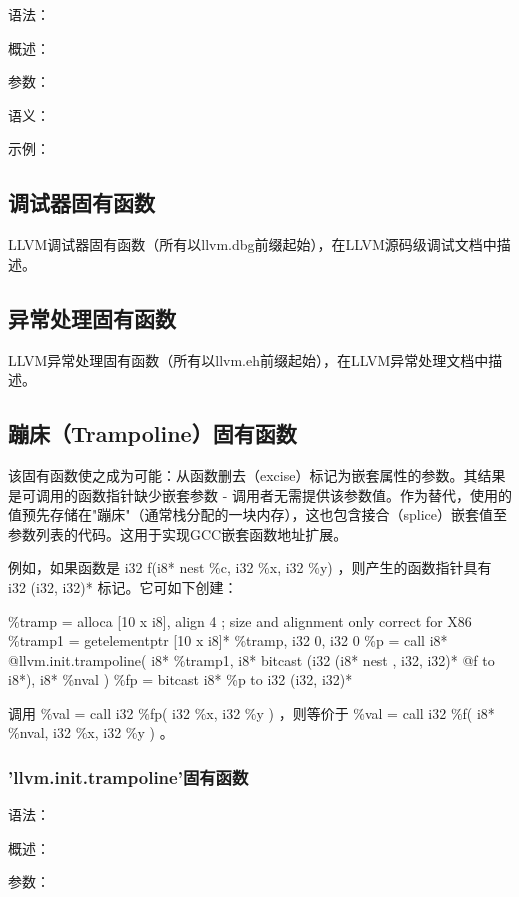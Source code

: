 \documentclass[12pt,a4paper]{article}
\begin{document}
{语法：

概述：

参数：

语义：

示例：


\subsection{调试器固有函数}

LLVM调试器固有函数（所有以llvm.dbg前缀起始），在LLVM源码级调试文档中描述。

\subsection{异常处理固有函数}

LLVM异常处理固有函数（所有以llvm.eh前缀起始），在LLVM异常处理文档中描述。

\subsection{蹦床（Trampoline）固有函数}

该固有函数使之成为可能：从函数删去（excise）标记为嵌套属性的参数。其结果是可调用的函数指针缺少嵌套参数 - 调用者无需提供该参数值。作为替代，使用的值预先存储在"蹦床"（通常栈分配的一块内存），这也包含接合（splice）嵌套值至参数列表的代码。这用于实现GCC嵌套函数地址扩展。

例如，如果函数是 i32 f(i8* nest \%c, i32 \%x, i32 \%y) ，则产生的函数指针具有 i32 (i32, i32)* 标记。它可如下创建：

\%tramp = alloca [10 x i8], align 4 ; size and alignment only correct for X86
\%tramp1 = getelementptr [10 x i8]* \%tramp, i32 0, i32 0
\%p = call i8* @llvm.init.trampoline( i8* \%tramp1, i8* bitcast (i32 (i8* nest , i32, i32)* @f to i8*), i8* \%nval )
\%fp = bitcast i8* \%p to i32 (i32, i32)*

调用 \%val = call i32 \%fp( i32 \%x, i32 \%y ) ，则等价于 \%val = call i32 \%f( i8* \%nval, i32 \%x, i32 \%y ) 。

\subsubsection{'llvm.init.trampoline'固有函数} %

语法：

概述：

参数：

}
\end{document}
